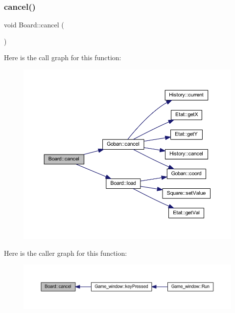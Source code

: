 \subsubsection{\texorpdfstring{cancel()}{cancel()}}
{\footnotesize\ttfamily void Board\+::cancel (\begin{DoxyParamCaption}{ }\end{DoxyParamCaption})}

Here is the call graph for this function\+:
\nopagebreak
\begin{figure}[H]
\begin{center}
\leavevmode
\includegraphics[width=350pt]{class_board_ac7ec911a62371650afd340d1535a1742_cgraph}
\end{center}
\end{figure}
Here is the caller graph for this function\+:
\nopagebreak
\begin{figure}[H]
\begin{center}
\leavevmode
\includegraphics[width=350pt]{class_board_ac7ec911a62371650afd340d1535a1742_icgraph}
\end{center}
\end{figure}
\mbox{\label{class_board_a5fda73da080403d8a71a8593d581c350}} 
